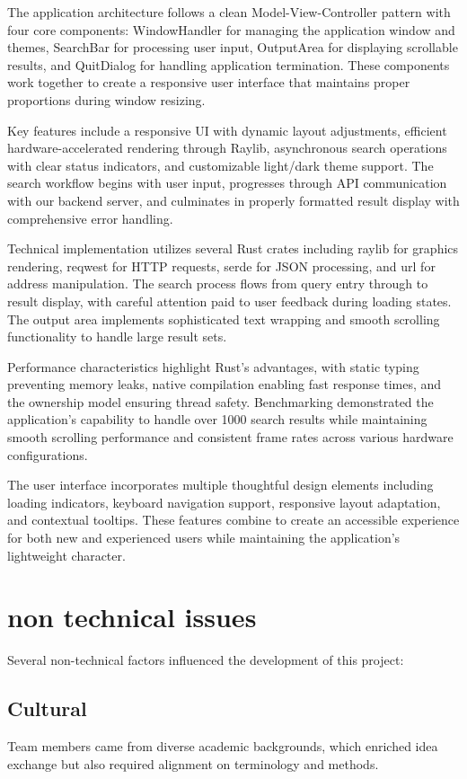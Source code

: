 \documentclass[twoside]{article}
\begin{document}
The application architecture follows a clean Model-View-Controller pattern with four core components: WindowHandler for managing the application window and themes, SearchBar for processing user input, OutputArea for displaying scrollable results, and QuitDialog for handling application termination. These components work together to create a responsive user interface that maintains proper proportions during window resizing.

Key features include a responsive UI with dynamic layout adjustments, efficient hardware-accelerated rendering through Raylib, asynchronous search operations with clear status indicators, and customizable light/dark theme support. The search workflow begins with user input, progresses through API communication with our backend server, and culminates in properly formatted result display with comprehensive error handling.

Technical implementation utilizes several Rust crates including raylib for graphics rendering, reqwest for HTTP requests, serde for JSON processing, and url for address manipulation. The search process flows from query entry through to result display, with careful attention paid to user feedback during loading states. The output area implements sophisticated text wrapping and smooth scrolling functionality to handle large result sets.

Performance characteristics highlight Rust's advantages, with static typing preventing memory leaks, native compilation enabling fast response times, and the ownership model ensuring thread safety. Benchmarking demonstrated the application's capability to handle over 1000 search results while maintaining smooth scrolling performance and consistent frame rates across various hardware configurations.

The user interface incorporates multiple thoughtful design elements including loading indicators, keyboard navigation support, responsive layout adaptation, and contextual tooltips. These features combine to create an accessible experience for both new and experienced users while maintaining the application's lightweight character.


\section{non technical issues}
Several non-technical factors influenced the development of this project:

\subsection{Cultural}
Team members came from diverse academic backgrounds, which enriched idea exchange but also required alignment on terminology and methods.
\end{document}
